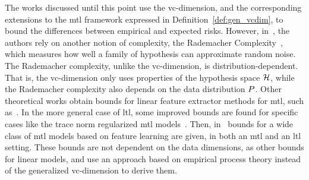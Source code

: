 %
The works discussed until this point use the \acrshort{vc}-dimension, and the corresponding extensions to the \acrshort{mtl} framework expressed in Definition~\ref{def:gen_vcdim}, to bound the differences between empirical and expected risks.
%
However, in~\cite{AndoZ05}, the authors rely on another notion  of complexity, the Rademacher Complexity~\citep{BartlettM02}, which measures how well a family of hypothesis can approximate random noise. The Rademacher complexity, unlike the \acrshort{vc}-dimension, is distribution-dependent. That is, the \acrshort{vc}-dimension only uses properties of the hypothesis space $\mathcal{H}$, while the Rademacher complexity also depends on the data distribution $P$. 
Other theoretical works obtain bounds for linear feature extractor methods for \acrshort{mtl}, such as~\cite{CavallantiCG10,Maurer06, Maurer06rad}.
In the more general case of \acrshort{ltl}, some improved bounds are found for specific cases like the trace norm regularized \acrshort{mtl} models~\citep{MaurerPR13}.
Then, in~\cite{MaurerPR16} bounds for a wide class of \acrshort{mtl} models based on feature learning are given, in both an \acrshort{mtl} and an \acrshort{ltl} setting. These bounds are not dependent on the data dimensions, as other bounds for linear models, and use an approach based on empirical process theory instead of the generalized \acrshort{vc}-dimension to derive them.











    




